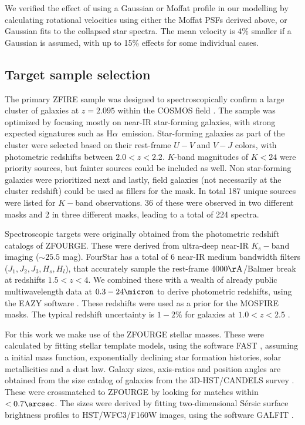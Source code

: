 \documentclass{emulateapj}
\newcommand{\ha}{H$\alpha$}
\begin{document}
We verified the effect of using a Gaussian or Moffat profile in our modelling by calculating rotational velocities using either the Moffat PSFs derived above, or Gaussian fits to the collapsed star spectra. The mean velocity is 4\% smaller if a Gaussian is assumed, with up to 15\% effects for some individual cases. 

\subsection{Target sample selection}

The primary ZFIRE sample was designed to spectroscopically confirm a large cluster of galaxies at $z=2.095$ \citep{Spitler12, Yuan14}  within the COSMOS field \citep{Scoville07}. The sample was optimized by focusing mostly on near-IR star-forming galaxies, with strong expected signatures such as \ha\ emission. Star-forming galaxies as part of the cluster were selected based on their rest-frame $U-V$ and $V-J$ colors, with photometric redshifts between $2.0<z<2.2$. $K$-band magnitudes of $K<24$ were priority sources, but fainter sources could be included as well. Non star-forming galaxies were prioritized next and lastly, field galaxies (not necessarily at the cluster redshift) could be used as fillers for the mask.  In total 187 unique sources were listed for $K-$band observations. 36 of these were observed in two different masks and 2 in three different masks, leading to a total of {224} spectra. 

Spectroscopic targets were originally obtained from the photometric redshift catalogs of ZFOURGE. The{se} were derived from ultra-deep near-IR $K_s-$band imaging ($\sim25.5$ mag). FourStar has a total of 6 near-IR medium bandwidth filters ($J_1,J_2,J_3,H_s,H_l$), that accurately sample the rest-frame $4000\mathrm{\AA}$/Balmer break at redshifts $1.5<z<4$. We combined these with a wealth of already public multiwavelength data at $0.3-24\micron$ to derive photometric redshifts, using the EAZY software \citep{Brammer08}. These redshifts were used as a prior for the MOSFIRE masks. The typical redshift uncertainty is $1-2\%$ for galaxies at $1.0<z<2.5$ \citep{Straatman16}. 

For this work we make use of the ZFOURGE stellar masses. These were calculated by fitting \citet{Bruzual03} stellar template models, using the software FAST \citep{Kriek09}, assuming a \citep{Chabrier03} initial mass function, exponentially declining star formation histories, solar metallicities and a \citet{Calzetti00} dust law. Galaxy sizes, axis-ratios and position angles are obtained from the size catalog of galaxies from the 3D-HST/CANDELS survey \citep{vanderWel14a,Skelton14}. These were crossmatched to ZFOURGE by looking for matches within $<0.7\arcsec$. The sizes were derived by fitting two-dimensional S\'ersic \citep{Sersic68} surface brightness profiles to HST/WFC3/F160W images, using the software GALFIT \citep{Peng10}.
\end{document}
